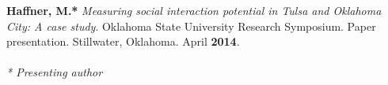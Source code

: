 \begin{cventries}
   \cventry
      {}
      {}
      {}
      {}
      {
        \begin{cvitems}
          \vspace{-2mm}
            \item {\textbf{Haffner, M.*} \textit{Measuring social interaction potential in Tulsa and Oklahoma City: A case study}. Oklahoma State University Research Symposium. Paper presentation. Stillwater, Oklahoma. April \textbf{2014}.} \\\\
            \textit{* Presenting author}
              \end{cvitems}
            }

\end{cventries}